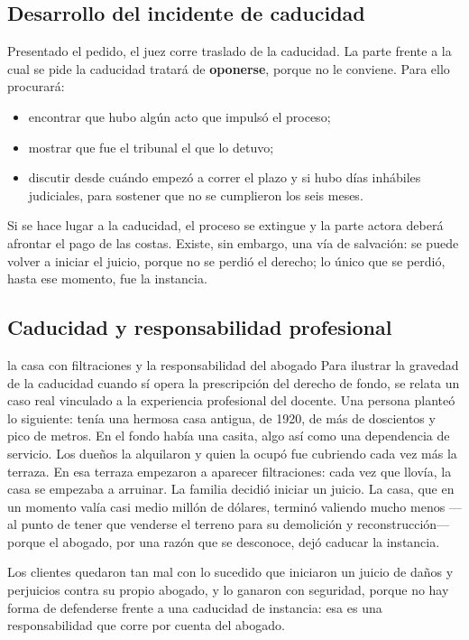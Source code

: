 \documentclass[12pt,oneside]{book}
\begin{document}
\subsection{Desarrollo del incidente de caducidad}

Presentado el pedido, el juez corre traslado de la caducidad.
La parte frente a la cual se pide la caducidad tratará de \textbf{oponerse}, porque no le conviene. Para ello procurará:

\begin{itemize}
    \item encontrar que hubo algún acto que impulsó el proceso;
    \item mostrar que fue el tribunal el que lo detuvo;
    \item discutir desde cuándo empezó a correr el plazo y si hubo días inhábiles judiciales, para sostener que no se cumplieron los seis meses.
\end{itemize}

Si se hace lugar a la caducidad, el proceso se extingue y la parte actora deberá afrontar el pago de las costas. Existe, sin embargo, una vía de salvación: se puede volver a iniciar el juicio, porque no se perdió el derecho; lo único que se perdió, hasta ese momento, fue la instancia.

\subsection{Caducidad y responsabilidad profesional}

\begin{example}{la casa con filtraciones y la responsabilidad del abogado}
Para ilustrar la gravedad de la caducidad cuando sí opera la prescripción del derecho de fondo, se relata un caso real vinculado a la experiencia profesional del docente. Una persona planteó lo siguiente: tenía una hermosa casa antigua, de 1920, de más de doscientos y pico de metros. En el fondo había una casita, algo así como una dependencia de servicio. Los dueños la alquilaron y quien la ocupó fue cubriendo cada vez más la terraza. En esa terraza empezaron a aparecer filtraciones: cada vez que llovía, la casa se empezaba a arruinar. La familia decidió iniciar un juicio. La casa, que en un momento valía casi medio millón de dólares, terminó valiendo mucho menos ---al punto de tener que venderse el terreno para su demolición y reconstrucción--- porque el abogado, por una razón que se desconoce, dejó caducar la instancia.

Los clientes quedaron tan mal con lo sucedido que iniciaron un juicio de daños y perjuicios contra su propio abogado, y lo ganaron con seguridad, porque no hay forma de defenderse frente a una caducidad de instancia: esa es una responsabilidad que corre por cuenta del abogado.
\end{example}
\end{document}
